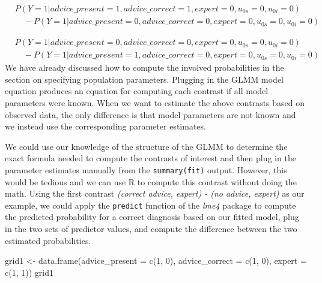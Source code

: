 \documentclass[
  man,
  floatsintext,
  longtable,
  a4paper,
  nolmodern,
  notxfonts,
  notimes,
  colorlinks=true,linkcolor=blue,citecolor=blue,urlcolor=blue]{apa7}
\newenvironment{Shaded}{\begin{snugshade}}{\end{snugshade}}
\newcommand{\AttributeTok}[1]{\textcolor[rgb]{0.40,0.45,0.13}{#1}}
\newcommand{\DecValTok}[1]{\textcolor[rgb]{0.68,0.00,0.00}{#1}}
\newcommand{\FunctionTok}[1]{\textcolor[rgb]{0.28,0.35,0.67}{#1}}
\newcommand{\NormalTok}[1]{\textcolor[rgb]{0.00,0.23,0.31}{#1}}
\newcommand{\OtherTok}[1]{\textcolor[rgb]{0.00,0.23,0.31}{#1}}
\begin{document}
\[
\begin{aligned}
& P(Y=1|advice\_present = 1, advice\_correct = 1, expert = 0, u_{0s} = 0, u_{0i} = 0) \\
& \quad - P(Y=1|advice\_present = 0, advice\_correct = 0, expert = 0, u_{0s} = 0, u_{0i} = 0)
\end{aligned}
\]

\[
\begin{aligned}
& P(Y=1|advice\_present = 0, advice\_correct = 0, expert = 0, u_{0s} = 0, u_{0i} = 0) \\
& \quad - P(Y=1|advice\_present = 1, advice\_correct = 0, expert = 0, u_{0s} = 0, u_{0i} = 0)
\end{aligned}
\] We have already discussed how to compute the involved probabilities
in the section on specifying population parameters. Plugging in the GLMM
model equation produces an equation for computing each contrast if all
model parameters were known. When we want to estimate the above
contrasts based on observed data, the only difference is that model
parameters are not known and we instead use the corresponding parameter
estimates.

We could use our knowledge of the structure of the GLMM to determine the
exact formula needed to compute the contrasts of interest and then plug
in the parameter estimates manually from the \texttt{summary(fit)}
output. However, this would be tedious and we can use R to compute this
contrast without doing the math. Using the first contrast \emph{(correct
advice, expert) - (no advice, expert)} as our example, we could apply
the \texttt{predict} function of the \emph{lme4} package to compute the
predicted probability for a correct diagnosis based on our fitted model,
plug in the two sets of predictor values, and compute the difference
between the two estimated probabilities.

\begin{Shaded}
\begin{Highlighting}[]
\NormalTok{grid1 }\OtherTok{\textless{}{-}} \FunctionTok{data.frame}\NormalTok{(}\AttributeTok{advice\_present =} \FunctionTok{c}\NormalTok{(}\DecValTok{1}\NormalTok{, }\DecValTok{0}\NormalTok{), }\AttributeTok{advice\_correct =} \FunctionTok{c}\NormalTok{(}\DecValTok{1}\NormalTok{, }\DecValTok{0}\NormalTok{), }
  \AttributeTok{expert =} \FunctionTok{c}\NormalTok{(}\DecValTok{1}\NormalTok{, }\DecValTok{1}\NormalTok{))}
\NormalTok{grid1}
\end{Highlighting}
\end{Shaded}
\end{document}

